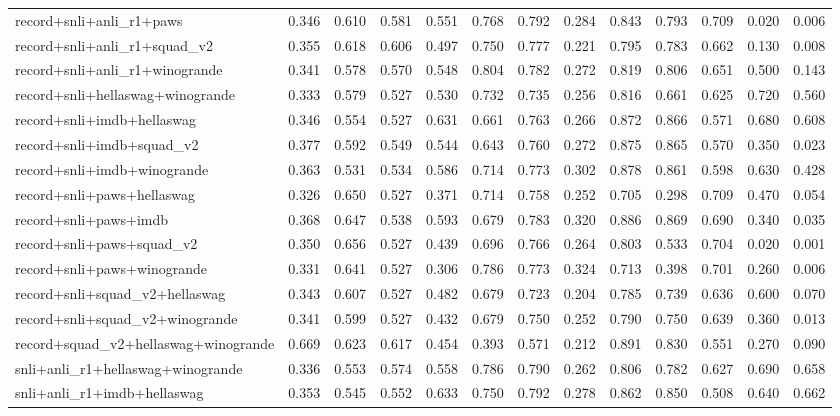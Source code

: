 \begin{table}[t]
\begin{tabular}{lrrrrrrrrrrrr}
    record+snli+anli\_r1+paws & 0.346 & 0.610 & 0.581 & 0.551 & 0.768 & 0.792 & 0.284 & 0.843 & 0.793 & 0.709 & 0.020 & 0.006 \\
    record+snli+anli\_r1+squad\_v2 & 0.355 & 0.618 & 0.606 & 0.497 & 0.750 & 0.777 & 0.221 & 0.795 & 0.783 & 0.662 & 0.130 & 0.008 \\
    record+snli+anli\_r1+winogrande & 0.341 & 0.578 & 0.570 & 0.548 & 0.804 & 0.782 & 0.272 & 0.819 & 0.806 & 0.651 & 0.500 & 0.143 \\
    record+snli+hellaswag+winogrande & 0.333 & 0.579 & 0.527 & 0.530 & 0.732 & 0.735 & 0.256 & 0.816 & 0.661 & 0.625 & 0.720 & 0.560 \\
    record+snli+imdb+hellaswag & 0.346 & 0.554 & 0.527 & 0.631 & 0.661 & 0.763 & 0.266 & 0.872 & 0.866 & 0.571 & 0.680 & 0.608 \\
    record+snli+imdb+squad\_v2 & 0.377 & 0.592 & 0.549 & 0.544 & 0.643 & 0.760 & 0.272 & 0.875 & 0.865 & 0.570 & 0.350 & 0.023 \\
    record+snli+imdb+winogrande & 0.363 & 0.531 & 0.534 & 0.586 & 0.714 & 0.773 & 0.302 & 0.878 & 0.861 & 0.598 & 0.630 & 0.428 \\
    record+snli+paws+hellaswag & 0.326 & 0.650 & 0.527 & 0.371 & 0.714 & 0.758 & 0.252 & 0.705 & 0.298 & 0.709 & 0.470 & 0.054 \\
    record+snli+paws+imdb & 0.368 & 0.647 & 0.538 & 0.593 & 0.679 & 0.783 & 0.320 & 0.886 & 0.869 & 0.690 & 0.340 & 0.035 \\
    record+snli+paws+squad\_v2 & 0.350 & 0.656 & 0.527 & 0.439 & 0.696 & 0.766 & 0.264 & 0.803 & 0.533 & 0.704 & 0.020 & 0.001 \\
    record+snli+paws+winogrande & 0.331 & 0.641 & 0.527 & 0.306 & 0.786 & 0.773 & 0.324 & 0.713 & 0.398 & 0.701 & 0.260 & 0.006 \\
    record+snli+squad\_v2+hellaswag & 0.343 & 0.607 & 0.527 & 0.482 & 0.679 & 0.723 & 0.204 & 0.785 & 0.739 & 0.636 & 0.600 & 0.070 \\
    record+snli+squad\_v2+winogrande & 0.341 & 0.599 & 0.527 & 0.432 & 0.679 & 0.750 & 0.252 & 0.790 & 0.750 & 0.639 & 0.360 & 0.013 \\
    record+squad\_v2+hellaswag+winogrande & 0.669 & 0.623 & 0.617 & 0.454 & 0.393 & 0.571 & 0.212 & 0.891 & 0.830 & 0.551 & 0.270 & 0.090 \\
    snli+anli\_r1+hellaswag+winogrande & 0.336 & 0.553 & 0.574 & 0.558 & 0.786 & 0.790 & 0.262 & 0.806 & 0.782 & 0.627 & 0.690 & 0.658 \\
    snli+anli\_r1+imdb+hellaswag & 0.353 & 0.545 & 0.552 & 0.633 & 0.750 & 0.792 & 0.278 & 0.862 & 0.850 & 0.508 & 0.640 & 0.662 \\

\end{tabular}
\end{table}
